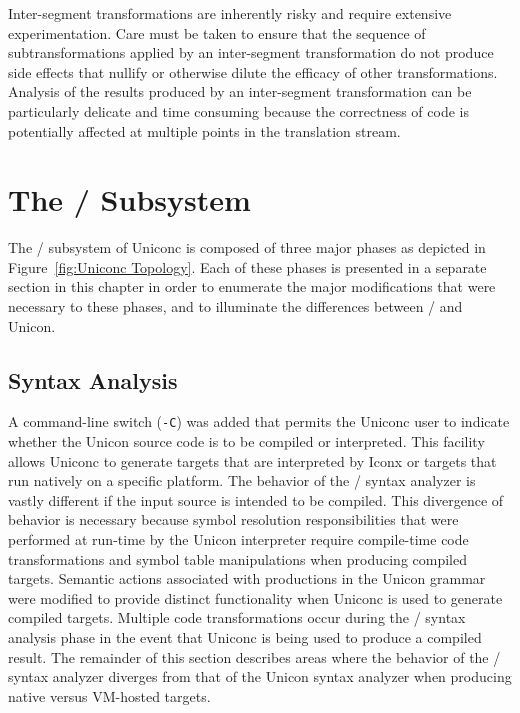 Inter-segment transformations are inherently risky and require extensive
experimentation. Care must be taken to ensure that the sequence of
subtransformations applied by an inter-segment transformation do not produce
side effects that nullify or otherwise dilute the efficacy of other
transformations. Analysis of the results produced by an inter-segment
transformation can be particularly delicate and time consuming because the
correctness of code is potentially affected at multiple points in the
translation stream.  

\section{The \UT/ Subsystem}

The \Ut/ subsystem of Uniconc is composed of three major phases as
depicted in Figure~\ref{fig:Uniconc Topology}. Each of these phases is
presented in a separate section in this chapter in order to enumerate
the major modifications that were necessary to these phases, and to
illuminate the differences between \Ut/ and Unicon.

\subsection{Syntax Analysis}

A command-line switch (\texttt{-C}) was added that permits the Uniconc
user to indicate whether the Unicon source code is to be compiled or
interpreted.  This facility allows Uniconc to generate targets that
are interpreted by Iconx or targets that run natively on a specific
platform. The behavior of the \Ut/ syntax analyzer is vastly different
if the input source is intended to be compiled. This divergence of
behavior is necessary because symbol resolution responsibilities that
were performed at \mbox{run-time} by the Unicon interpreter require
\mbox{compile-time} code transformations and symbol table
manipulations when producing compiled targets. Semantic actions
associated with productions in the Unicon grammar were modified to
provide distinct functionality when Uniconc is used to generate
compiled targets. Multiple code transformations occur during the \Ut/
syntax analysis phase in the event that Uniconc is being used to
produce a compiled result. The remainder of this section describes
areas where the behavior of the \Ut/ syntax analyzer diverges from
that of the Unicon syntax analyzer when producing native versus
VM-hosted targets.

